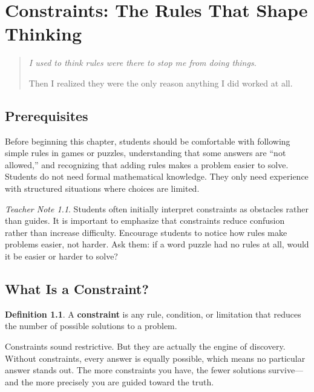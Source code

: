 \documentclass[11pt]{book}
\theoremstyle{definition}
\newtheorem{definition}{Definition}[chapter]
\theoremstyle{remark}
\newtheorem{teachernote}{Teacher Note}[chapter]
\newenvironment{deepthought}
  {\begin{quote}\itshape}
  {\end{quote}}
\begin{document}
\chapter{Constraints: The Rules That Shape Thinking}

\begin{deepthought}
I used to think rules were there to stop me from doing things.

Then I realized they were the only reason anything I did worked at all.
\end{deepthought}

\section*{Prerequisites}

Before beginning this chapter, students should be comfortable with
following simple rules in games or puzzles, understanding that some
answers are ``not allowed,'' and recognizing that adding rules makes a
problem easier to solve. Students do not need formal mathematical
knowledge. They only need experience with structured situations where
choices are limited.

\begin{teachernote}
Students often initially interpret constraints as obstacles rather than
guides. It is important to emphasize that constraints reduce confusion
rather than increase difficulty. Encourage students to notice how rules
make problems easier, not harder. Ask them: if a word puzzle had no
rules at all, would it be easier or harder to solve?
\end{teachernote}

\section{What Is a Constraint?}

\begin{definition}
A \textbf{constraint} is any rule, condition, or limitation that reduces
the number of possible solutions to a problem.
\end{definition}

Constraints sound restrictive. But they are actually the engine of discovery.
Without constraints, every answer is equally possible, which means no
particular answer stands out. The more constraints you have, the fewer
solutions survive---and the more precisely you are guided toward the truth.
\end{document}
